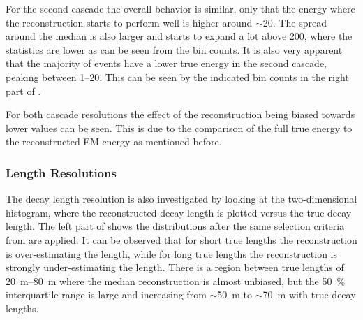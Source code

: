 For the second cascade the overall behavior is similar, only that the energy where the reconstruction starts to perform well is higher around $\sim$\SI{20}{\gev}. The spread around the median is also larger and starts to expand a lot above \SI{200}{\gev}, where the statistics are lower as can be seen from the bin counts. It is also very apparent that the majority of events have a lower true energy in the second cascade, peaking between \SIrange[range-phrase=~and~]{1}{20}{\gev}. This can be seen by the indicated bin counts in the right part of .

For both cascade resolutions the effect of the reconstruction being biased towards lower values can be seen. This is due to the comparison of the full true energy to the reconstructed EM energy as mentioned before.


\subsubsection{Length Resolutions} 

The decay length resolution is also investigated by looking at the two-dimensional histogram, where the reconstructed decay length is plotted versus the true decay length. The left part of  shows the distributions after the same selection criteria from  are applied. It can be observed that for short true lengths the reconstruction is over-estimating the length, while for long true lengths the reconstruction is strongly under-estimating the length. There is a region between true lengths of \SIrange[range-phrase=~and~]{20}{80}{\meter} where the median reconstruction is almost unbiased, but the \SI{50}{\percent} interquartile range is large and increasing from $\sim$\SI{50}{\meter} to $\sim$\SI{70}{\meter} with true decay lengths.

